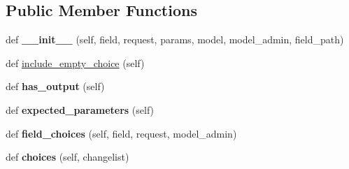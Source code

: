 \subsection*{Public Member Functions}
\begin{DoxyCompactItemize}
\item 
\mbox{\label{classdjango_1_1contrib_1_1admin_1_1filters_1_1_related_field_list_filter_a19a65de9793431f8dd6a7eefcb1632af}} 
def {\bfseries \+\_\+\+\_\+init\+\_\+\+\_\+} (self, field, request, params, model, model\+\_\+admin, field\+\_\+path)
\item 
def \mbox{\hyperlink{classdjango_1_1contrib_1_1admin_1_1filters_1_1_related_field_list_filter_af042307a1c135a6461c06b481bce13ce}{include\+\_\+empty\+\_\+choice}} (self)
\item 
\mbox{\label{classdjango_1_1contrib_1_1admin_1_1filters_1_1_related_field_list_filter_ac0e7e94cf72609803d4c75e03d2079c7}} 
def {\bfseries has\+\_\+output} (self)
\item 
\mbox{\label{classdjango_1_1contrib_1_1admin_1_1filters_1_1_related_field_list_filter_aca86573aa31b5586b6404f100311d127}} 
def {\bfseries expected\+\_\+parameters} (self)
\item 
\mbox{\label{classdjango_1_1contrib_1_1admin_1_1filters_1_1_related_field_list_filter_a4953b4e5903fee441f3be01349bce9a8}} 
def {\bfseries field\+\_\+choices} (self, field, request, model\+\_\+admin)
\item 
\mbox{\label{classdjango_1_1contrib_1_1admin_1_1filters_1_1_related_field_list_filter_acb7bd8c5643e88e23220f28e2da2d49e}} 
def {\bfseries choices} (self, changelist)
\end{DoxyCompactItemize}
